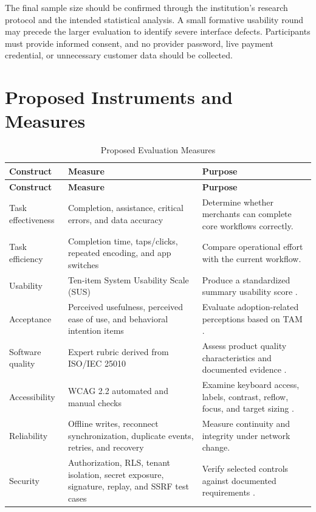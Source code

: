 \documentclass[12pt,oneside]{report}
\begin{document}
The final sample size should be confirmed through the institution's research
protocol and the intended statistical analysis. A small formative usability
round may precede the larger evaluation to identify severe interface defects.
Participants must provide informed consent, and no provider password, live
payment credential, or unnecessary customer data should be collected.

\section{Proposed Instruments and Measures}
\begin{longtable}{L{0.24\textwidth}L{0.32\textwidth}L{0.35\textwidth}}
\caption{Proposed Evaluation Measures}\label{tab:measures}\\
\toprule
\textbf{Construct} & \textbf{Measure} & \textbf{Purpose} \\
\midrule
\endfirsthead
\toprule
\textbf{Construct} & \textbf{Measure} & \textbf{Purpose} \\
\midrule
\endhead
Task effectiveness & Completion, assistance, critical errors, and data accuracy
& Determine whether merchants can complete core workflows correctly. \\
Task efficiency & Completion time, taps/clicks, repeated encoding, and app
switches & Compare operational effort with the current workflow. \\
Usability & Ten-item System Usability Scale (SUS) & Produce a standardized
summary usability score \parencite{brooke1996sus,bangor2008sus}. \\
Acceptance & Perceived usefulness, perceived ease of use, and behavioral
intention items & Evaluate adoption-related perceptions based on TAM
\parencite{davis1989tam}. \\
Software quality & Expert rubric derived from ISO/IEC 25010 & Assess product
quality characteristics and documented evidence \parencite{iso25010}. \\
Accessibility & WCAG 2.2 automated and manual checks & Examine keyboard access,
labels, contrast, reflow, focus, and target sizing \parencite{w3c2024wcag}. \\
Reliability & Offline writes, reconnect synchronization, duplicate events,
retries, and recovery & Measure continuity and integrity under network change. \\
Security & Authorization, RLS, tenant isolation, secret exposure, signature,
replay, and SSRF test cases & Verify selected controls against documented
requirements \parencite{owasp2025asvs}. \\
\bottomrule
\end{longtable}
\end{document}
